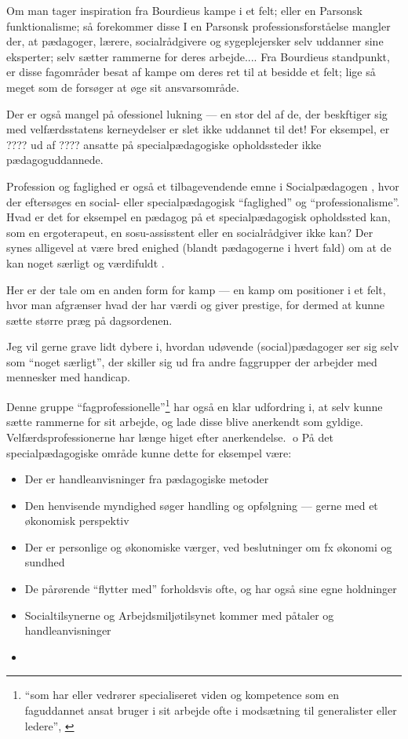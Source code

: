 
Om man tager inspiration fra Bourdieus kampe i et felt; eller en Parsonsk funktionalisme; så forekommer disse 
I en Parsonsk professionsforståelse mangler der, at pædagoger, lærere, socialrådgivere og sygeplejersker selv uddanner sine eksperter; selv sætter rammerne for deres arbejde....
Fra Bourdieus standpunkt, er disse fagområder besat af kampe om deres ret til at besidde et felt; lige så meget som de forsøger at øge sit ansvarsområde.

Der er også mangel på ofessionel lukning — en stor del af de, der beskftiger sig med velfærdsstatens kerneydelser er slet ikke uddannet til det! For eksempel, er ???? ud af ???? ansatte på specialpædagogiske opholdssteder ikke pædagoguddannede.

Profession og faglighed er også et tilbagevendende emne i Socialpædagogen \autocite[fx]{petersenHvadSigerEksperten2019}, hvor der eftersøges en social- eller specialpædagogisk “faglighed” og “professionalisme”.
Hvad er det for eksempel en pædagog på et specialpædagogisk opholdssted kan, som en ergoterapeut, en sosu-assisstent eller en socialrådgiver ikke kan?
Der synes alligevel at være bred enighed (blandt pædagogerne i hvert fald) om at de kan noget særligt og værdifuldt \autocite{petersenSlagsMenneskeligAltmuligmand2019}.

Her er der tale om en anden form for kamp --- en kamp om positioner i et felt, hvor man afgrænser hvad der har værdi og giver prestige, for dermed at kunne sætte større præg på dagsordenen.

Jeg vil gerne grave lidt dybere i, hvordan udøvende (social)pædagoger ser sig selv som “noget særligt”, der skiller sig ud fra andre faggrupper der arbejder med mennesker med handicap.

Denne gruppe “fagprofessionelle”\footnote{“som har eller vedrører specialiseret viden og kompetence som en faguddannet ansat bruger i sit arbejde ofte i modsætning til generalister eller ledere”, \autocite{FagprofessionelDanskeOrdbog}} har også en klar udfordring i, at selv kunne sætte rammerne for sit arbejde, og lade disse blive anerkendt som gyldige.
Velfærdsprofessionerne har længe higet efter anerkendelse.
o
På det specialpædagogiske område kunne dette for eksempel være:
\begin{itemize}
  \item
    Der er handleanvisninger fra pædagogiske metoder
  \item
    Den henvisende myndighed søger handling og opfølgning — gerne med et økonomisk perspektiv
  \item
    Der er personlige og økonomiske værger, ved beslutninger om fx økonomi og sundhed
  \item
    De pårørende “flytter med” forholdsvis ofte, og har også sine egne holdninger
  \item
    Socialtilsynerne og Arbejdsmiljøtilsynet kommer med påtaler og handleanvisninger
  \item
\end{itemize}


